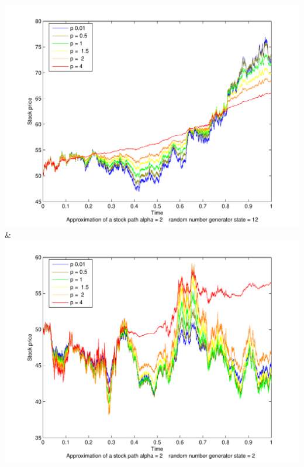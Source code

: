 \documentclass[a4paper,onecolumn,draft]{IEEEtran}
\begin{document}
{		 \includegraphics[width=\stockplotsize]{stock_alpha2}&
			\includegraphics[width=\stockplotsize]{stock_s2_a2}\LL
			}
		
\end{document}
